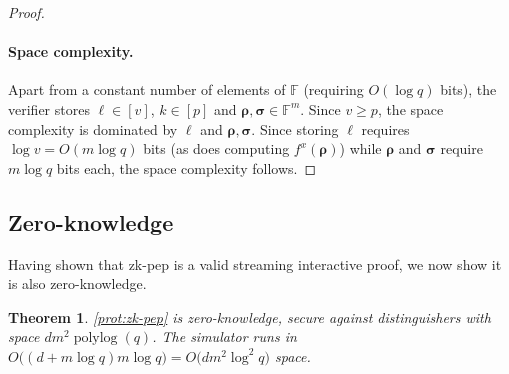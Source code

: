 \documentclass[10pt,a4paper]{article}
\newif\iflipics\lipicsfalse
\newtheorem{theorem}{Theorem}[section]
\theoremstyle{definition}
\newcommand{\field}{\mathbb{F}}
\newcommand{\polylog}{\operatorname{polylog}}
\newcommand{\vcommitlength}{v}
\newcommand{\pcommitlength}{p}
\newcommand{\dimension}{m}
\newcommand{\degree}{d}
\newcommand{\fieldsize}{q}
\newcommand{\fingerprinttuple}{\bm{\rho}}
\newcommand{\Fingerprinttuple}{\bm{\sigma}}
\begin{document}
\begin{proof}
    \paragraph*{Space complexity\iflipics\else.\fi} Apart from a constant number of elements of $\field$ (requiring $O(\log \fieldsize)$ bits), the verifier stores $\ell \in [\vcommitlength]$, $k \in [\pcommitlength]$ and $\fingerprinttuple, \Fingerprinttuple \in \field^\dimension$. Since $\vcommitlength \geq \pcommitlength$, the space complexity is dominated by $\ell$ and $\fingerprinttuple, \Fingerprinttuple$. Since storing $\ell$ requires $\log \vcommitlength = O(\dimension \log \fieldsize)$ bits (as does computing $f^x(\fingerprinttuple)$) while $\fingerprinttuple$ and $\Fingerprinttuple$ require $\dimension \log \fieldsize$ bits each, the space complexity follows.
\end{proof}

\subsection{Zero-knowledge}

Having shown that \textsf{zk-pep} is a valid streaming interactive proof, we now show it is also zero-knowledge.


\begin{theorem}
    \label{thm:pep-zk}
    \cref{prot:zk-pep} is zero-knowledge, secure against distinguishers with space $\degree\dimension^2 \polylog(\fieldsize)$. The simulator runs in $O\big((\degree + \dimension \log \fieldsize) \dimension \log \fieldsize\big) = O\big(\degree \dimension^2 \log^2 \fieldsize\big)$ space.
\end{theorem}
\end{document}
